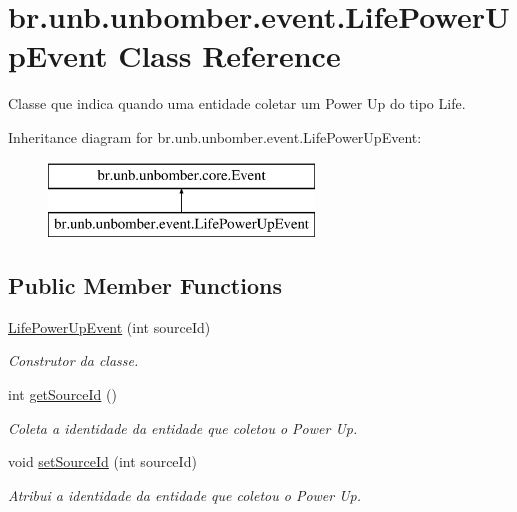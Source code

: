 \hypertarget{classbr_1_1unb_1_1unbomber_1_1event_1_1_life_power_up_event}{\section{br.\+unb.\+unbomber.\+event.\+Life\+Power\+Up\+Event Class Reference}
\label{classbr_1_1unb_1_1unbomber_1_1event_1_1_life_power_up_event}
}


Classe que indica quando uma entidade coletar um Power Up do tipo Life.  


Inheritance diagram for br.\+unb.\+unbomber.\+event.\+Life\+Power\+Up\+Event\+:\begin{figure}[H]
\begin{center}
\leavevmode
\includegraphics[height=2.000000cm]{classbr_1_1unb_1_1unbomber_1_1event_1_1_life_power_up_event}
\end{center}
\end{figure}
\subsection*{Public Member Functions}
\begin{DoxyCompactItemize}
\item 
\hyperlink{classbr_1_1unb_1_1unbomber_1_1event_1_1_life_power_up_event_a839a847b9205a22b2acab29c4034ad04}{Life\+Power\+Up\+Event} (int source\+Id)
\begin{DoxyCompactList}\small\item\em Construtor da classe. \end{DoxyCompactList}\item 
int \hyperlink{classbr_1_1unb_1_1unbomber_1_1event_1_1_life_power_up_event_a356cd4d5d4d096143d5ac73dd543d3f5}{get\+Source\+Id} ()
\begin{DoxyCompactList}\small\item\em Coleta a identidade da entidade que coletou o Power Up. \end{DoxyCompactList}\item 
void \hyperlink{classbr_1_1unb_1_1unbomber_1_1event_1_1_life_power_up_event_a36e327188f438b1166b511ef3771e8c6}{set\+Source\+Id} (int source\+Id)
\begin{DoxyCompactList}\small\item\em Atribui a identidade da entidade que coletou o Power Up. \end{DoxyCompactList}\end{DoxyCompactItemize}


